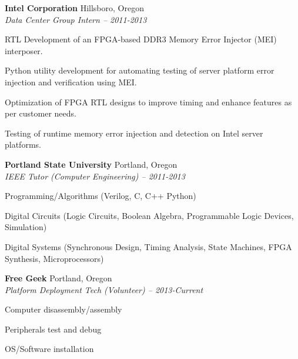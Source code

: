 \documentclass{article}
\begin{document}
	\hspace{-10pt}
  \vspace{3pt}

	\vspace{3pt}


	\hspace{-10pt}
	\textbf{Intel Corporation} Hillsboro, Oregon\\
	\emph{Data Center Group Intern -- 2011-2013}
	\begin{tight}
		\item RTL Development of an FPGA-based DDR3 Memory Error Injector (MEI) interposer. 
		\item Python utility development for automating testing of server platform error injection and verification using MEI.
		\item Optimization of FPGA RTL designs to improve timing and enhance features as per customer needs.
		\item Testing of runtime memory error injection and detection on Intel server platforms.
	\end{tight} 

	\textbf{Portland State University} Portland, Oregon\\
	\emph{IEEE Tutor (Computer Engineering) -- 2011-2013}		
	\begin{tight}
		\item Programming/Algorithms (Verilog, C, C++ Python)
		\item Digital Circuits (Logic Circuits, Boolean Algebra, Programmable Logic Devices, Simulation)
		\item Digital Systems (Synchronous Design, Timing Analysis, State Machines, FPGA Synthesis, Microprocessors)
	\end{tight}

	\textbf{Free Geek} Portland, Oregon\\
	\emph{Platform Deployment Tech (Volunteer) -- 2013-Current} 
	\begin{tight}
		\item Computer disassembly/assembly
		\item Peripherals test and debug
		\item OS/Software installation
	\end{tight}
\end{document}
